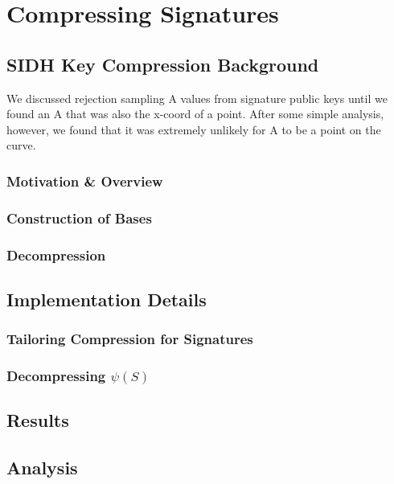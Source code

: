 \chapter{Compressing Signatures}

\section{SIDH Key Compression Background}

We discussed rejection sampling A values from signature public keys until we found an A that was also the x-coord of a point. After some simple analysis, however, we found that it was extremely unlikely for A to be a point on the curve.\\

\subsection{Motivation \& Overview}


\subsection{Construction of Bases}

\subsection{}

\subsection{Decompression}

\section{Implementation Details}

\subsection{Tailoring Compression for Signatures}

\subsection{Decompressing $\psi(S)$}

\section{Results}

\section{Analysis}

